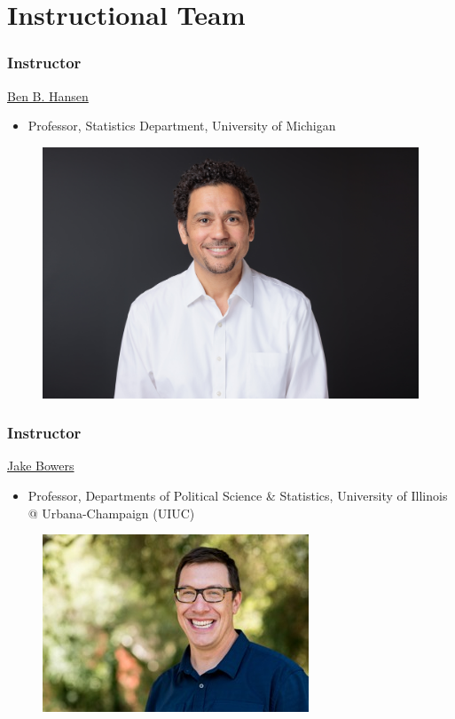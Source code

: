 \documentclass[table, xcolor = {dvipsnames}, 9pt]{beamer}
\theoremstyle{plain}
\begin{document}
\section{Instructional Team}
\begin{frame}[t]
\frametitle{Instructor}
\vfill
\href{https://dept.stat.lsa.umich.edu/~bbh/}{Ben B. Hansen}
\begin{itemize} \vfill
\item Professor, Statistics Department, University of Michigan
\end{itemize} \vfill
\begin{figure}[H]
\includegraphics[width=0.75\linewidth]{bbhansen_photo_2025_3x2_f-smile_hi-res.jpg}%
\end{figure}
\vfill
\end{frame}
\begin{frame}[t]
\frametitle{Instructor}
\vfill
\href{https://www.jakebowers.org/}{Jake Bowers}
\begin{itemize} \vfill
\item Professor, Departments of Political Science \&  Statistics,
  University of Illinois @ Urbana-Champaign (UIUC)
\end{itemize} \vfill
\begin{figure}[H]
\includegraphics[width=0.75\linewidth]{jakeBowers.jpg}%
\end{figure}
\vfill
\end{frame}
\end{document}
